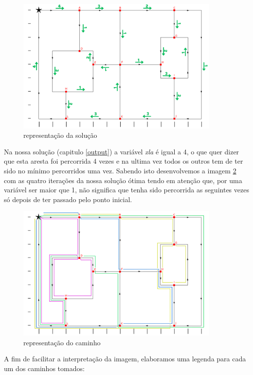 \documentclass[a4paper]{report}
\begin{document}
\begin{figure}[H]
    \begin{center}
        \includegraphics[width=0.9\textwidth]{images/desafioVisited.png}\par
        \caption{representação da solução}
        \label{fig:visited}
    \end{center}
\end{figure}
Na nossa solução (capitulo \ref{output}) a variável \textit{xla} é igual a 4, o
que quer dizer que esta aresta foi percorrida 4 vezes e na ultima vez todos os
outros tem de ter sido no mínimo percorridos uma vez. Sabendo isto desenvolvemos
a imagem \ref{fig:path} com as quatro iterações da nossa solução ótima tendo em
atenção que, por uma variável ser maior que 1, não significa que tenha sido
percorrida as seguintes vezes só depois de ter passado pelo ponto inicial.

\begin{figure}[H]
    \begin{center}
        \includegraphics[width=0.9\textwidth]{images/desafioSolucao.png}\par
        \caption{representação do caminho}
        \label{fig:path}
    \end{center}
\end{figure}
A fim de facilitar a interpretação da imagem, elaboramos uma legenda para cada
um dos caminhos tomados:
\end{document}
